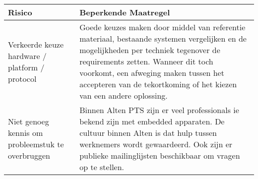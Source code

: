 \begin{center}
\begin{tabular}{| p{5cm}| p{9cm}|}
\hline
{\bf Risico} & {\bf Beperkende Maatregel}\\
\hline

Verkeerde keuze hardware / platform / protocol & Goede keuzes maken door middel van referentie materiaal, bestaande systemen vergelijken en de mogelijkheden per techniek tegenover de requirements zetten. Wanneer dit toch voorkomt, een afweging maken tussen het accepteren van de tekortkoming of het kiezen van een andere oplossing.\\
\hline
Niet genoeg kennis om probleemstuk te overbruggen & Binnen Alten PTS zijn er veel professionals ie bekend zijn met embedded apparaten. De cultuur binnen Alten is dat hulp tussen werknemers wordt gewaardeerd. Ook zijn er publieke mailinglijsten beschikbaar om vragen op te stellen.\\
\hline


\end{tabular}
\end{center}

